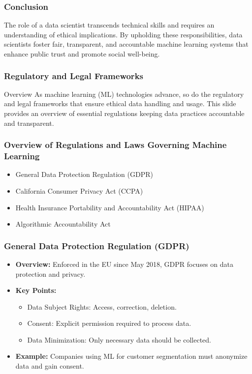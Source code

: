 \documentclass{beamer}
\begin{document}
\begin{frame}[fragile]
    \frametitle{Conclusion}
    The role of a data scientist transcends technical skills and requires an understanding of ethical implications. By upholding these responsibilities, data scientists foster fair, transparent, and accountable machine learning systems that enhance public trust and promote social well-being.
\end{frame}

\begin{frame}[fragile]
    \frametitle{Regulatory and Legal Frameworks}
    \begin{block}{Overview}
        As machine learning (ML) technologies advance, so do the regulatory and legal frameworks that ensure ethical data handling and usage. 
        This slide provides an overview of essential regulations keeping data practices accountable and transparent.
    \end{block}
\end{frame}

\begin{frame}[fragile]
    \frametitle{Overview of Regulations and Laws Governing Machine Learning}
    \begin{itemize}
        \item General Data Protection Regulation (GDPR)
        \item California Consumer Privacy Act (CCPA)
        \item Health Insurance Portability and Accountability Act (HIPAA)
        \item Algorithmic Accountability Act
    \end{itemize}
\end{frame}

\begin{frame}[fragile]
    \frametitle{General Data Protection Regulation (GDPR)}
    \begin{itemize}
        \item \textbf{Overview:} Enforced in the EU since May 2018, GDPR focuses on data protection and privacy.
        \item \textbf{Key Points:}
            \begin{itemize}
                \item Data Subject Rights: Access, correction, deletion.
                \item Consent: Explicit permission required to process data.
                \item Data Minimization: Only necessary data should be collected.
            \end{itemize}
        \item \textbf{Example:} Companies using ML for customer segmentation must anonymize data and gain consent.
    \end{itemize}
\end{frame}
\end{document}
